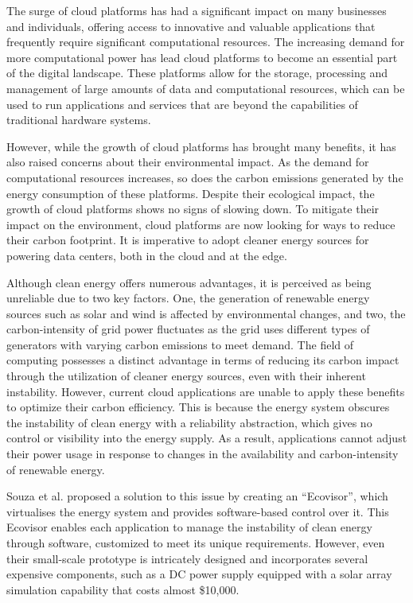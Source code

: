 The surge of cloud platforms has had a significant impact on many businesses and
individuals, offering access to innovative and valuable applications that
frequently require significant computational resources. The increasing demand
for more computational power has lead cloud platforms to become an essential
part of the digital landscape. These platforms allow for the storage, processing
and management of large amounts of data and computational resources, which can
be used to run applications and services that are beyond the capabilities of
traditional hardware systems.

However, while the growth of cloud platforms has brought many benefits, it has
also raised concerns about their environmental impact. As the demand for
computational resources increases, so does the carbon emissions generated by the
energy consumption of these platforms. Despite their ecological impact, the
growth of cloud platforms shows no signs of slowing down. To mitigate their
impact on the environment, cloud platforms are now looking for ways to reduce
their carbon footprint. It is imperative to adopt cleaner energy sources for
powering data centers, both in the cloud and at the edge.
\medskip

Although clean energy offers numerous advantages, it is perceived as being
unreliable due to two key factors. One, the generation of renewable energy
sources such as solar and wind is affected by environmental changes, and two,
the carbon-intensity of grid power fluctuates as the grid uses different types
of generators with varying carbon emissions to meet demand. The field of
computing possesses a distinct advantage in terms of reducing its carbon impact
through the utilization of cleaner energy sources, even with their inherent
instability. However, current cloud applications are unable to apply these
benefits to optimize their carbon efficiency. This is because the energy system
obscures the instability of clean energy with a reliability abstraction, which
gives no control or visibility into the energy supply. As a result, applications
cannot adjust their power usage in response to changes in the availability and
carbon-intensity of renewable energy.

Souza et al. proposed a solution to this issue by creating an
\enquote{Ecovisor}, which virtualises the energy system and provides
software-based control over it. This Ecovisor enables each application to manage
the instability of clean energy through software, customized to meet its unique
requirements. However, even their small-scale prototype is intricately designed
and incorporates several expensive components, such as a DC power supply
equipped with a solar array simulation capability that costs almost \$10,000.

